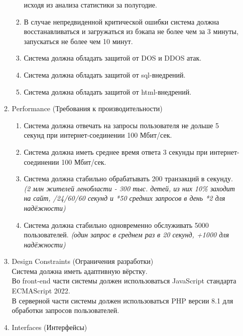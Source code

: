 \begin{enumerate}
\begin{enumerate}[label=3.\arabic*]
\begin{enumerate}[label=3.3.\arabic*]
            исходя из анализа статистики за полугодие.
            \item В случае непредвиденной критической ошибки система должна восстанавливаться и загружаться из бэкапа не более чем за 3 минуты, запускаться не более чем 10 минут.
            \item Система должна обладать защитой от DOS и DDOS атак.
            \item Система должна обладать защитой от sql-внедрений.
            \item Система должна обладать защитой от html-внедрений.
        \end{enumerate}
        \item Performance (Требования к производительности)
        \begin{enumerate}[label=3.4.\arabic*]
            \item Система должна отвечать на запросы пользователя не дольше 5 секунд при интернет-соединении 100 Мбит/сек.
            \item Система должна иметь среднее время ответа 3 секунды при интернет-соединении 100 Мбит/сек.
            \item Система должна стабильно обрабатывать 200 транзакций в секунду. \\
            \tiny \textit{(2 млн жителей ленобласти - 300 тыс. детей, из них 10\% заходит на сайт, /24/60/60 секунд и *50 средних запросов в день *2 для надёжности)}
            \normalsize
            \item Система должна стабильно одновременно обслуживать 5000 пользователей.
            \tiny \textit{(один запрос в среднем раз в 20 секунд, +1000 для надёжности)}
            \normalsize
        \end{enumerate}
        \item Design Constraints (Ограничения разработки) \\
        Система должна иметь адаптивную вёрстку. \\
        Во front-end части системы должен использоваться JavaScript стандарта ECMAScript 2022. \\
        В серверной части системы должен использоваться PHP версии 8.1 для обработки запросов пользователей.
        \item Interfaces (Интерфейсы)
        \BgThispage

\end{enumerate}
\end{enumerate}
